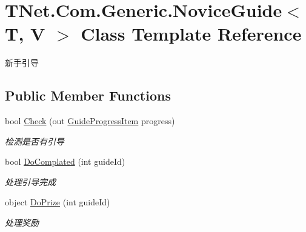 \hypertarget{class_t_net_1_1_com_1_1_generic_1_1_novice_guide}{}\section{T\+Net.\+Com.\+Generic.\+Novice\+Guide$<$ T, V $>$ Class Template Reference}
\label{class_t_net_1_1_com_1_1_generic_1_1_novice_guide}


新手引导  


\subsection*{Public Member Functions}
\begin{DoxyCompactItemize}
\item 
bool \mbox{\hyperlink{class_t_net_1_1_com_1_1_generic_1_1_novice_guide_a6116a7001e7fa1d1215d4d3cdff887b2}{Check}} (out \mbox{\hyperlink{class_t_net_1_1_com_1_1_model_1_1_guide_progress_item}{Guide\+Progress\+Item}} progress)
\begin{DoxyCompactList}\small\item\em 检测是否有引导 \end{DoxyCompactList}\item 
bool \mbox{\hyperlink{class_t_net_1_1_com_1_1_generic_1_1_novice_guide_a90971688f10f54b2b8b66ce922de9ffa}{Do\+Complated}} (int guide\+Id)
\begin{DoxyCompactList}\small\item\em 处理引导完成 \end{DoxyCompactList}\item 
object \mbox{\hyperlink{class_t_net_1_1_com_1_1_generic_1_1_novice_guide_ad9598c5930cb709bb07afddc075bcc02}{Do\+Prize}} (int guide\+Id)
\begin{DoxyCompactList}\small\item\em 处理奖励 \end{DoxyCompactList}\end{DoxyCompactItemize}
